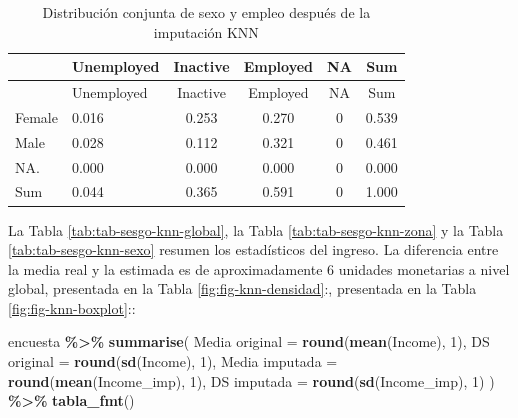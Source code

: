 \documentclass[
  spanish,
  12pt,
]{book}
\newenvironment{Shaded}{\begin{snugshade}}{\end{snugshade}}
\newcommand{\AttributeTok}[1]{\textcolor[rgb]{0.13,0.29,0.53}{#1}}
\newcommand{\DecValTok}[1]{\textcolor[rgb]{0.00,0.00,0.81}{#1}}
\newcommand{\FunctionTok}[1]{\textcolor[rgb]{0.13,0.29,0.53}{\textbf{#1}}}
\newcommand{\NormalTok}[1]{#1}
\newcommand{\OtherTok}[1]{\textcolor[rgb]{0.56,0.35,0.01}{#1}}
\newcommand{\SpecialCharTok}[1]{\textcolor[rgb]{0.81,0.36,0.00}{\textbf{#1}}}
\newcommand{\StringTok}[1]{\textcolor[rgb]{0.31,0.60,0.02}{#1}}
\begin{document}
\begin{Shaded}
\end{Shaded}

\begin{longtable}[]{@{}llcccc@{}}
\caption{\label{tab:tab-knn-sexo-despues}Distribución conjunta de sexo y empleo después de la imputación KNN}\tabularnewline
\toprule\noalign{}
& Unemployed & Inactive & Employed & NA & Sum \\
\midrule\noalign{}
\endfirsthead
\toprule\noalign{}
& Unemployed & Inactive & Employed & NA & Sum \\
\midrule\noalign{}
\endhead
\bottomrule\noalign{}
\endlastfoot
Female & 0.016 & 0.253 & 0.270 & 0 & 0.539 \\
Male & 0.028 & 0.112 & 0.321 & 0 & 0.461 \\
NA. & 0.000 & 0.000 & 0.000 & 0 & 0.000 \\
Sum & 0.044 & 0.365 & 0.591 & 0 & 1.000 \\
\end{longtable}

La Tabla \ref{tab:tab-sesgo-knn-global}, la Tabla \ref{tab:tab-sesgo-knn-zona} y la Tabla \ref{tab:tab-sesgo-knn-sexo} resumen los estadísticos del ingreso. La diferencia entre la media real y la estimada es de aproximadamente 6 unidades monetarias a nivel global, presentada en la Tabla \ref{fig:fig-knn-densidad}:, presentada en la Tabla \ref{fig:fig-knn-boxplot}::

\begin{Shaded}
\begin{Highlighting}[]
\NormalTok{encuesta }\SpecialCharTok{\%\textgreater{}\%}
  \FunctionTok{summarise}\NormalTok{(}
    \StringTok{\textasciigrave{}}\AttributeTok{Media original}\StringTok{\textasciigrave{}}  \OtherTok{=} \FunctionTok{round}\NormalTok{(}\FunctionTok{mean}\NormalTok{(Income), }\DecValTok{1}\NormalTok{),}
    \StringTok{\textasciigrave{}}\AttributeTok{DS original}\StringTok{\textasciigrave{}}     \OtherTok{=} \FunctionTok{round}\NormalTok{(}\FunctionTok{sd}\NormalTok{(Income), }\DecValTok{1}\NormalTok{),}
    \StringTok{\textasciigrave{}}\AttributeTok{Media imputada}\StringTok{\textasciigrave{}}  \OtherTok{=} \FunctionTok{round}\NormalTok{(}\FunctionTok{mean}\NormalTok{(Income\_imp), }\DecValTok{1}\NormalTok{),}
    \StringTok{\textasciigrave{}}\AttributeTok{DS imputada}\StringTok{\textasciigrave{}}     \OtherTok{=} \FunctionTok{round}\NormalTok{(}\FunctionTok{sd}\NormalTok{(Income\_imp), }\DecValTok{1}\NormalTok{)}
\NormalTok{  ) }\SpecialCharTok{\%\textgreater{}\%} \FunctionTok{tabla\_fmt}\NormalTok{()}
\end{Highlighting}
\end{Shaded}
\end{document}

